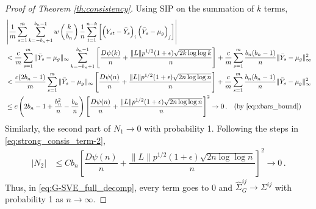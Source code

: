 \documentclass[11pt]{article}
\theoremstyle{remark}
\begin{document}
\begin{proof}[Proof of Theorem \ref{th:consistency}]
Using SIP on the summation of $k$ terms,
\begin{align*}
    & \left|\dfrac{1}{m}\sum_{s=1}^{m}\sum_{k=-b_n+1}^{b_n-1}w\left(\dfrac{k}{b_n}\right)\dfrac{1}{n}\sum_{t=1}^{n-k}\left[ \left(Y_{st} - \bar{Y}_s \right)_i  \left(\bar{Y}_s - \mu_g \right)_j \right] \right|\\
   &  < \dfrac{c}{m}\sum\limits_{s=1}^{m}\|\bar{Y}_s - \mu_g\|_{\infty}\sum\limits_{k=-b_n + 1}^{b_n-1}\left[ \dfrac{D \psi(k)}{n} + \dfrac{\|L\| p^{1/2}(1+\epsilon)\sqrt{2k \log\log k}}{n}  \right] + \dfrac{c}{m}\sum\limits_{s=1}^{m} \dfrac{b_n(b_n-1)}{n}\|\bar{Y}_s - \mu_g\|_{\infty}^2\\
   &  < \dfrac{c(2b_n-1)}{m}\sum\limits_{s=1}^{m}\|\bar{Y}_s - \mu_g\|_{\infty}\left[ \dfrac{D \psi(n)}{n} + \dfrac{\|L\| p^{1/2}(1+\epsilon)\sqrt{2n \log\log n}}{n}  \right] + \dfrac{c}{m}\sum\limits_{s=1}^{m} \dfrac{b_n(b_n-1)}{n}\|\bar{Y}_s - \mu_g\|_{\infty}^2 \\
   &  \leq   c\left(2b_n - 1 + \dfrac{b_n^2}{n} - \dfrac{b_n}{n}\right)\left[ \dfrac{D \psi(n)}{n} + \dfrac{\|L\| p^{1/2}(1+\epsilon)\sqrt{2n \log\log n}}{n}  \right]^2  \to 0\,. \quad  \text{(by \eqref{eq:xbars_bound})}
\end{align*}
%
% 
%
%
Similarly, the second part of $N_1 \to 0$ with probability 1. 
%
Following the steps in \eqref{eq:strong_consis_term-2}, 
\begin{align*}
    |N_2| & \leq Cb_n\left[ \dfrac{D \psi(n)}{n} + \dfrac{\|L\| p^{1/2}(1+\epsilon)\sqrt{2n \log\log n}}{n}  \right]^2  \to 0\,.
\end{align*}
Thus, in \eqref{eq:G-SVE_full_decomp}, every term goes to 0 and $\hat{\Sigma}_{G}^{ij} \to \Sigma^{ij}$ with probability 1 as $n \to \infty$. 
\end{proof}
\end{document}
